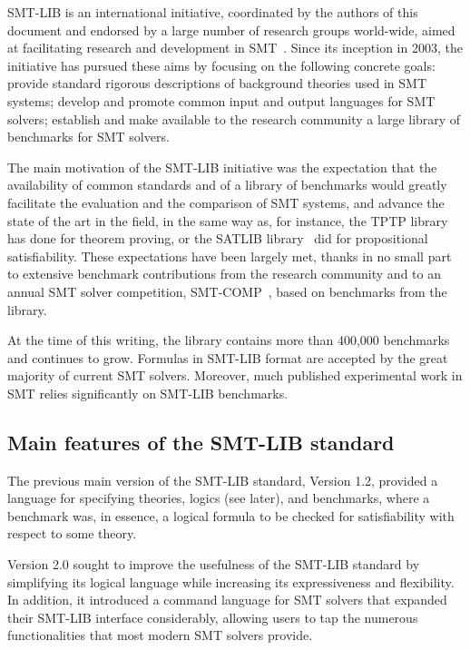 
SMT-LIB is an international initiative,
coordinated by the authors of this document and 
endorsed by a large number of research groups world-wide,
aimed at facilitating research and development in SMT~\cite{SMT-LIB}.
Since its inception in 2003, the initiative has pursued these aims
by focusing on the following concrete goals:
provide standard rigorous descriptions of background theories used in SMT systems;
develop and promote common input and output languages for SMT solvers;
establish and make available to the research community a large library of
benchmarks for SMT solvers. 

The main motivation of the SMT-LIB initiative was the expectation that 
the availability of common standards and of a library of benchmarks would 
greatly facilitate the evaluation and the comparison of SMT systems,
and advance the state of the art in the field,
in the same way as, for instance,
the TPTP library~\cite{Sut-JAR-09} has done for theorem proving,
or the SATLIB library~\cite{HooStu-SAT-00} did 
for propositional satisfiability.
These expectations have been largely met, 
thanks in no small part 
to extensive benchmark contributions from the research community and
to an annual SMT solver competition, SMT-COMP~\cite{BardMS-CAV-05},
based on benchmarks from the library.

At the time of this writing, 
the library contains more than 400,000 benchmarks and continues to grow.
Formulas in SMT-LIB format are accepted by the great majority 
of current SMT solvers.
Moreover, much published experimental work in SMT relies significantly 
on SMT-LIB benchmarks.


\subsection{Main features of the SMT-LIB standard}

The previous main version of the SMT-LIB standard, Version 1.2, 
provided a language for specifying theories, logics (see later), and benchmarks,
where a benchmark was, in essence, a logical formula to be checked for 
satisfiability with respect to some theory.

Version 2.0 sought to improve the usefulness of the SMT-LIB standard
by simplifying its logical language 
while increasing its expressiveness and flexibility.
In addition, 
it introduced a command language for SMT solvers that 
expanded their SMT-LIB interface considerably,
allowing users to tap the numerous functionalities 
that most modern SMT solvers provide.

